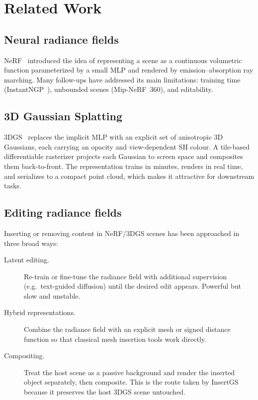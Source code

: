 
\chapter{Related Work}\label{chapter:related}

\section{Neural radiance fields}

\ac{NeRF}~\parencite{mildenhall2020nerf} introduced the idea of representing a
scene as a continuous volumetric function parameterized by a small MLP and
rendered by emission–absorption ray marching. Many follow-ups have
addressed its main limitations: training time
(InstantNGP~\parencite{mueller2022instant}), unbounded scenes
(Mip-NeRF~360), and editability.

\section{3D Gaussian Splatting}

\ac{3DGS}~\parencite{kerbl3Dgaussians} replaces the implicit MLP with an
explicit set of anisotropic 3D Gaussians, each carrying an opacity and
view-dependent \ac{SH} colour. A tile-based differentiable rasterizer
projects each Gaussian to screen space and composites them
back-to-front. The representation trains in minutes, renders in real time,
and serializes to a compact point cloud, which makes it attractive for
downstream tasks.

\section{Editing radiance fields}

Inserting or removing content in NeRF/3DGS scenes has been approached in
three broad ways:

\begin{description}
  \item[Latent editing.] Re-train or fine-tune the radiance field with
    additional supervision (e.g.\ text-guided diffusion) until the desired
    edit appears. Powerful but slow and unstable.
  \item[Hybrid representations.] Combine the radiance field with an
    explicit mesh or signed distance function so that classical mesh
    insertion tools work directly.
  \item[Compositing.] Treat the host scene as a passive background and
    render the inserted object separately, then composite. This is the
    route taken by InsertGS because it preserves the host 3DGS scene
    untouched.
\end{description}

